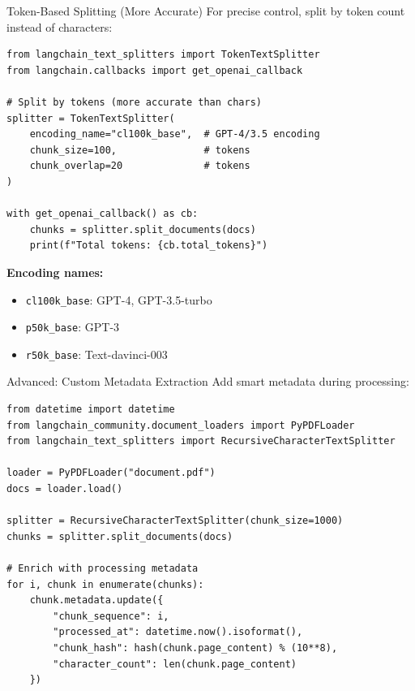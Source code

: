 \documentclass[aspectratio=169,11pt]{beamer}
\begin{document}
\begin{frame}[fragile]{Token-Based Splitting (More Accurate)}
  For precise control, split by token count instead of characters:
  \begin{lstlisting}
from langchain_text_splitters import TokenTextSplitter
from langchain.callbacks import get_openai_callback

# Split by tokens (more accurate than chars)
splitter = TokenTextSplitter(
    encoding_name="cl100k_base",  # GPT-4/3.5 encoding
    chunk_size=100,               # tokens
    chunk_overlap=20              # tokens
)

with get_openai_callback() as cb:
    chunks = splitter.split_documents(docs)
    print(f"Total tokens: {cb.total_tokens}")
  \end{lstlisting}

  \vspace{0.5cm}
  \textbf{Encoding names:}
  \begin{itemize}
    \setlength{\itemsep}{1pt}
    \item \texttt{cl100k\_base}: GPT-4, GPT-3.5-turbo
    \item \texttt{p50k\_base}: GPT-3
    \item \texttt{r50k\_base}: Text-davinci-003
  \end{itemize}
\end{frame}

\begin{frame}[fragile]{Advanced: Custom Metadata Extraction}
  Add smart metadata during processing:
  \begin{lstlisting}
from datetime import datetime
from langchain_community.document_loaders import PyPDFLoader
from langchain_text_splitters import RecursiveCharacterTextSplitter

loader = PyPDFLoader("document.pdf")
docs = loader.load()

splitter = RecursiveCharacterTextSplitter(chunk_size=1000)
chunks = splitter.split_documents(docs)

# Enrich with processing metadata
for i, chunk in enumerate(chunks):
    chunk.metadata.update({
        "chunk_sequence": i,
        "processed_at": datetime.now().isoformat(),
        "chunk_hash": hash(chunk.page_content) % (10**8),
        "character_count": len(chunk.page_content)
    })
  \end{lstlisting}
\end{frame}
\end{document}
